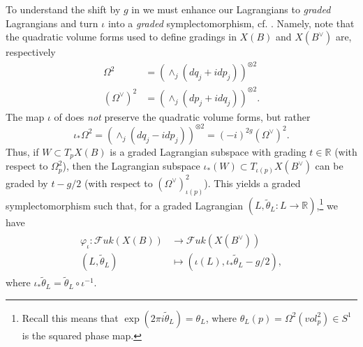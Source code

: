 \documentclass[10pt]{amsart}
\theoremstyle{definition}
\theoremstyle{remark}
\def\R{\mathbb{R}}
\def\inv{^{-1}}
\newcommand{\mcal}{\mathcal}
\begin{document}
To understand the shift by $g$ in  we must enhance our Lagrangians to \emph{graded} Lagrangians and turn $\iota$ into a \emph{graded} symplectomorphism, cf. \cite{seidel2000graded}.
Namely, note that the quadratic volume forms used to define gradings in $X(B)$ and $X(B^\vee)$ are, respectively \cite{abouzaid2014family}
\begin{align*}
    \Omega^2 &= (\wedge_j (dq_j + i dp_j))^{\otimes 2}\\
    (\Omega^\vee)^2 &= (\wedge_j (dp_j + idq_j))^{\otimes 2}.
\end{align*}
The map $\iota$ of  does \emph{not} preserve the quadratic volume forms, but rather 
$$
\iota_*\Omega^2 = (\wedge_j (dq_j - i dp_j))^{\otimes 2} = (-i)^{2g} (\Omega^\vee)^2.
$$
Thus, if $W \subset T_pX(B)$ is a graded Lagrangian subspace with grading $t \in \R$ (with respect to $\Omega^2_p$), then the Lagrangian subspace $\iota_*(W) \subset T_{\iota(p)}X(B^\vee)$ can be graded by $t-g/2$ (with respect to $(\Omega^\vee)^2_{\iota(p)}$).
This yields a graded symplectomorphism such that, for a graded Lagrangian  $(L, \tilde\theta_L : L \to \R)$,\footnote{Recall this means that $\exp(2\pi i \tilde\theta_L) = \theta_L$, where $\theta_L(p) = \Omega^2(vol^2_p) \in S^1$ is the squared phase map.} we have 
\begin{align}\label{eq:gradediota}
    \begin{split}
        \varphi_\iota: \mcal Fuk(X(B)) &\to \mcal Fuk(X(B^\vee))\\
        (L, \tilde \theta_L) &\mapsto (\iota(L), \iota_*\tilde\theta_L - g/2),
    \end{split}
\end{align}
where $\iota_*\tilde\theta_L = \tilde\theta_L \circ \iota\inv$.
\end{document}
